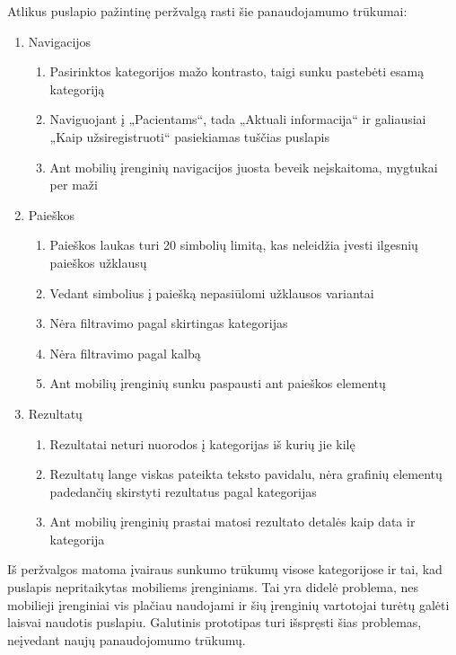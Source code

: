 \documentclass{VUMIFPSkursinis}
\begin{document}
Atlikus puslapio pažintinę peržvalgą rasti šie panaudojamumo trūkumai:
\begin{enumerate}
	\item Navigacijos
	\renewcommand*{\theenumii}{\theenumi.\arabic{enumii}}
	\renewcommand{\labelenumii}{\theenumii}
	\begin{enumerate}
		\item Pasirinktos kategorijos mažo kontrasto, taigi sunku pastebėti esamą kategoriją
		\item Naviguojant į „Pacientams“, tada „Aktuali informacija“ ir galiausiai „Kaip užsiregistruoti“ pasiekiamas tuščias puslapis
		\item Ant mobilių įrenginių navigacijos juosta beveik neįskaitoma, mygtukai per maži
	\end{enumerate}
	\item Paieškos
	\renewcommand*{\theenumii}{\theenumi.\arabic{enumii}}
	\renewcommand{\labelenumii}{\theenumii}
	\begin{enumerate}
		\item Paieškos laukas turi 20 simbolių limitą, kas neleidžia įvesti ilgesnių paieškos užklausų
		\item Vedant simbolius į paiešką nepasiūlomi užklausos variantai
		\item Nėra filtravimo pagal skirtingas kategorijas
		\item Nėra filtravimo pagal kalbą
		\item Ant mobilių įrenginių sunku paspausti ant paieškos elementų
	\end{enumerate}
	\item Rezultatų
	\renewcommand*{\theenumii}{\theenumi.\arabic{enumii}}
	\renewcommand{\labelenumii}{\theenumii}
	\begin{enumerate}
		\item Rezultatai neturi nuorodos į kategorijas iš kurių jie kilę
		\item Rezultatų lange viskas pateikta teksto pavidalu, nėra grafinių elementų padedančių skirstyti rezultatus pagal kategorijas
		\item Ant mobilių įrenginių prastai matosi rezultato detalės kaip data ir kategorija
	\end{enumerate}
\end{enumerate}
\vspace{0,5cm}
Iš peržvalgos matoma įvairaus sunkumo trūkumų visose kategorijose ir tai, kad puslapis nepritaikytas mobiliems įrenginiams. Tai yra didelė problema, nes mobilieji įrenginiai vis plačiau naudojami \cite{EmergingmHealthEn} ir šių įrenginių vartotojai turėtų galėti laisvai naudotis puslapiu. Galutinis prototipas turi išspręsti šias problemas, neįvedant naujų panaudojomumo trūkumų.
\end{document}
